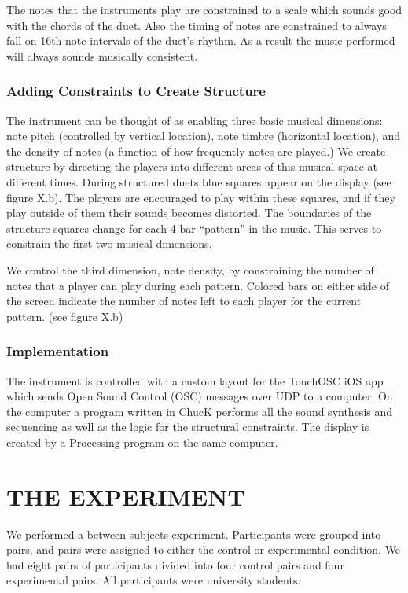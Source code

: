 \documentclass{article}
\begin{document}
The notes that the instruments play are constrained to a scale which sounds good with the chords of the duet.  Also the timing of notes are constrained to always fall on 16th note intervals of the duet’s rhythm.  As a result the music performed will always sounds musically consistent.

\subsubsection{Adding Constraints to Create Structure}

The instrument can be thought of as enabling three basic musical dimensions: note pitch (controlled by vertical location), note timbre (horizontal location), and the density of notes (a function of how frequently notes are played.)  We create structure by directing the players into different areas of this musical space at different times. During structured duets blue squares appear on the display (see figure X.b).  The players are encouraged to play within these squares, and if they play outside of them their sounds becomes distorted.  The boundaries of the structure squares change for each 4-bar “pattern” in the music.  This serves to constrain the first two musical dimensions.

We control the third dimension, note density, by constraining the number of notes that a player can play during each pattern.  Colored bars on either side of the screen indicate the number of notes left to each player for the current pattern. (see figure X.b)

\subsubsection{Implementation}

The instrument is controlled with a custom layout for the TouchOSC iOS app which sends Open Sound Control (OSC) messages over UDP to a computer.  On the computer a program written in ChucK performs all the sound synthesis and sequencing as well as the logic for the structural constraints.  The display is created by a Processing program on the same computer.



\section{THE EXPERIMENT}
We performed a between subjects experiment.  Participants were grouped into pairs, and pairs were assigned to either the control or experimental condition.  We had eight pairs of participants divided into four control pairs and four experimental pairs. All participants were university students.
\end{document}
